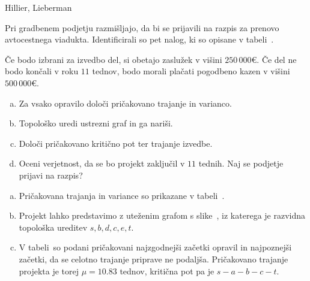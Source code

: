 \begin{naloga}{Hillier, Lieberman}{\cite[Problem~10.4-4]{hl}}
\begin{vprasanje}
Pri gradbenem podjetju razmišljajo,
da bi se prijavili na razpis za prenovo av\-to\-cest\-ne\-ga viadukta.
Identificirali so pet nalog, ki so opisane v tabeli~\tab.

Če bodo izbrani za izvedbo del, si obetajo zaslužek v višini $250\,000 €$.
Če del ne bodo končali v roku $11$ tednov,
bodo morali plačati pogodbeno kazen v višini $500\,000 €$.
\begin{enumerate}[(a)]
\item Za vsako opravilo določi pričakovano trajanje in varianco.
\item Topološko uredi ustrezni graf in ga nariši.
\item Določi pričakovano kritično pot ter trajanje izvedbe.
\item Oceni verjetnost, da se bo projekt zaključil v $11$ tednih.
Naj se podjetje prijavi na razpis?
\end{enumerate}

\begin{tabela}
\end{tabela}
\end{vprasanje}

\begin{odgovor}
\begin{enumerate}[(a)]
\item Pričakovana trajanja in variance
so prikazane v tabeli~.

\item Projekt lahko predstavimo z uteženim grafom s slike~\fig,
iz katerega je razvidna topološka ureditev $s, b, d, c, e, t$.

\item V tabeli~
so podani pričakovani najzgodnejši začetki opravil in najpoznejši začetki,
da se celotno trajanje priprave ne podaljša.
Pričakovano trajanje projekta je torej $\mu = 10.83$ tednov,
kritična pot pa je $s - a - b - c - t$.


\end{enumerate}
\end{odgovor}
\end{naloga}
